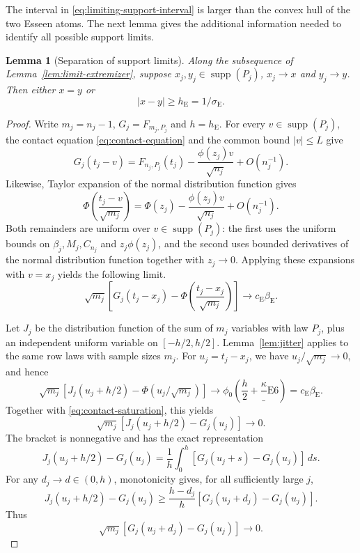 \documentclass[aop]{imsart}
\theoremstyle{plain}
\newtheorem{lemma}[theorem]{Lemma}
\theoremstyle{definition}
\theoremstyle{definition}
\newcommand{\ce}{c_{\mathrm E}}
\newcommand{\se}{\sigma_{\mathrm E}}
\newcommand{\be}{\beta_{\mathrm E}}
\newcommand{\ke}{\kappa_{\mathrm E}}
\DeclareMathOperator{\supp}{supp}
\begin{document}
The interval in \eqref{eq:limiting-support-interval} is larger than the convex hull of the two Esseen atoms. The next lemma gives the additional information needed to identify all possible support limits.

\begin{lemma}[Separation of support limits]\label{lem:support-separation}
Along the subsequence of Lemma~\ref{lem:limit-extremizer}, suppose \(x_j,y_j\in\supp(P_j)\), \(x_j\to x\) and \(y_j\to y\). Then either \(x=y\) or
\[
 |x-y|\ge h_{\mathrm E}=1/\se.
\]
\end{lemma}

\begin{proof}
Write $m_j=n_j-1$, $G_j=F_{m_j,P_j}$ and $h=h_{\mathrm E}$.
For every $v\in\supp(P_j)$, the contact equation
\eqref{eq:contact-equation} and the common bound $|v|\le L$ give
\[
 G_j(t_j-v)=F_{n_j,P_j}(t_j)
 -\frac{\phi(z_j)v}{\sqrt{n_j}}+O(n_j^{-1}).
\]
Likewise, Taylor expansion of the normal distribution function gives
\[
 \Phi\left(\frac{t_j-v}{\sqrt{m_j}}\right)
 =\Phi(z_j)-\frac{\phi(z_j)v}{\sqrt{n_j}}+O(n_j^{-1}).
\]
Both remainders are uniform over $v\in\supp(P_j)$: the first
uses the uniform bounds on $\beta_j,M_j,C_{n_j}$ and
$z_j\phi(z_j)$, and the second uses bounded derivatives of the
normal distribution function together with $z_j\to0$.
Applying these expansions with $v=x_j$ yields the following limit.
\begin{equation}\label{eq:contact-saturation}
 \sqrt{m_j}\left[
 G_j(t_j-x_j)-
 \Phi\left(\frac{t_j-x_j}{\sqrt{m_j}}\right)\right]
 \longrightarrow\ce\be.
\end{equation}

Let \(J_j\) be the distribution function of the sum of \(m_j\) variables with law \(P_j\), plus an independent uniform variable on \([-h/2,h/2]\). Lemma~\ref{lem:jitter} applies to the same row laws with sample sizes \(m_j\). For \(u_j=t_j-x_j\), we have \(u_j/\sqrt{m_j}\to0\), and hence
\[
 \sqrt{m_j}\left[J_j(u_j+h/2)-\Phi(u_j/\sqrt{m_j})\right]
 \longrightarrow
 \phi_0\left(\frac h2+\frac\ke6\right)=\ce\be.
\]
Together with \eqref{eq:contact-saturation}, this yields
\begin{equation}\label{eq:jitter-saturation}
 \sqrt{m_j}[J_j(u_j+h/2)-G_j(u_j)]\longrightarrow0.
\end{equation}
The bracket is nonnegative and has the exact representation
\begin{equation}\label{eq:jitter-contact-integral}
 J_j(u_j+h/2)-G_j(u_j)
 =\frac1h\int_0^h[G_j(u_j+s)-G_j(u_j)]\,ds.
\end{equation}
For any \(d_j\to d\in(0,h)\), monotonicity gives, for all sufficiently large \(j\),
\[
 J_j(u_j+h/2)-G_j(u_j)
 \ge\frac{h-d_j}{h}
       [G_j(u_j+d_j)-G_j(u_j)].
\]
Thus
\begin{equation}\label{eq:flat-contact-interval}
 \sqrt{m_j}[G_j(u_j+d_j)-G_j(u_j)]\longrightarrow0.
\end{equation}


\end{proof}
\end{document}
